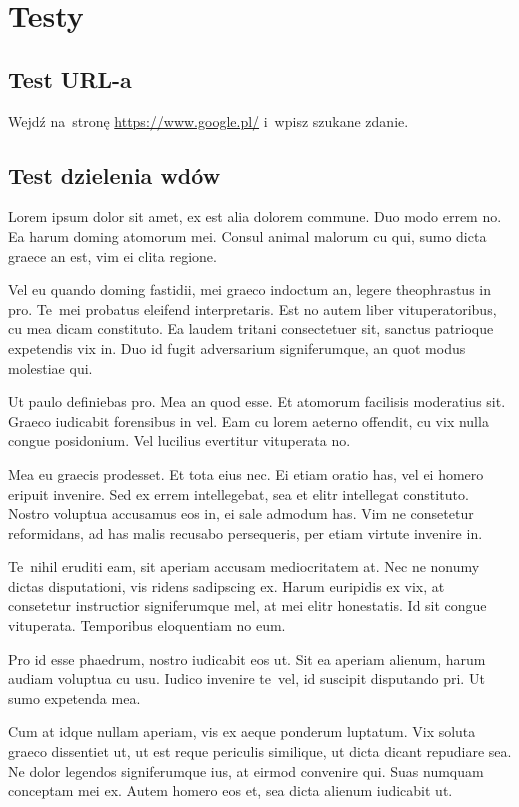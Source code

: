 \chapter{Testy}

\section{Test URL-a}

Wejdź na~stronę \url{https://www.google.pl/} i~wpisz szukane zdanie.

\clearpage

\section{Test dzielenia wdów}

Lorem ipsum dolor sit amet, ex est alia dolorem commune. Duo modo errem no. Ea harum doming atomorum mei. Consul animal malorum cu qui, sumo dicta graece an est, vim ei clita regione.

Vel eu quando doming fastidii, mei graeco indoctum an, legere theophrastus in pro. Te~mei probatus eleifend interpretaris. Est no autem liber vituperatoribus, cu mea dicam constituto. Ea laudem tritani consectetuer sit, sanctus patrioque expetendis vix in. Duo id fugit adversarium signiferumque, an quot modus molestiae qui.

Ut paulo definiebas pro. Mea an quod esse. Et atomorum facilisis moderatius sit. Graeco iudicabit forensibus in vel. Eam cu lorem aeterno offendit, cu vix nulla congue posidonium. Vel lucilius evertitur vituperata no.

Mea eu graecis prodesset. Et tota eius nec. Ei etiam oratio has, vel ei homero eripuit invenire. Sed ex errem intellegebat, sea et elitr intellegat constituto. Nostro voluptua accusamus eos in, ei sale admodum has. Vim ne consetetur reformidans, ad has malis recusabo persequeris, per etiam virtute invenire in.

Te~nihil eruditi eam, sit aperiam accusam mediocritatem at. Nec ne nonumy dictas disputationi, vis ridens sadipscing ex. Harum euripidis ex vix, at consetetur instructior signiferumque mel, at mei elitr honestatis. Id sit congue vituperata. Temporibus eloquentiam no eum.

Pro id esse phaedrum, nostro iudicabit eos ut. Sit ea aperiam alienum, harum audiam voluptua cu usu. Iudico invenire te~vel, id suscipit disputando pri. Ut sumo expetenda mea.

Cum at idque nullam aperiam, vis ex aeque ponderum luptatum. Vix soluta graeco dissentiet ut, ut est reque periculis similique, ut dicta dicant repudiare sea. Ne dolor legendos signiferumque ius, at eirmod convenire qui. Suas numquam conceptam mei ex. Autem homero eos et, sea dicta alienum iudicabit ut.

